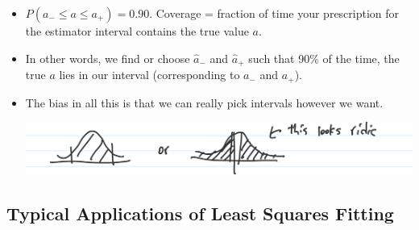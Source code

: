 \begin{itemize}
      \item $P(a_{-} \leq a \leq a_{+}) = 0.90$.
            Coverage = fraction of time your prescription for the estimator interval contains the true value $a$.
      \item In other words, we find or choose $\hat{a}_{-}$ and $\hat{a}_{+}$ such that 90\% of the time, the true $a$ lies in our interval (corresponding to $a_{-}$ and $a_{+}$).
      \item The bias in all this is that we can really pick intervals however we want.

            \includegraphics[width=0.6\linewidth]{Images/lec11-biased-intervals.png}
\end{itemize}

\subsection{Typical Applications of Least Squares Fitting}


